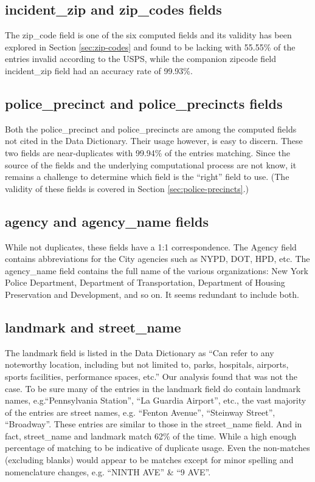 \documentclass[12pt, titlepage]{article}
\begin{document}
 \subsection{incident\_zip and zip\_codes fields}
 \label{sec:zipcodes}
 The zip\_code field is one of the six computed fields and its validity 
 has been explored in Section \ref{sec:zip-codes} and found to be 
 lacking with 55.55\% of the entries invalid according to the 
 USPS, while the companion zipcode field incident\_zip field had 
 an accuracy rate of 99.93\%. 

 \subsection{police\_precinct and police\_precincts fields} 
 \label{sec:police} 
Both the police\_precinct and police\_precincts are among the computed 
fields not cited in the Data Dictionary. Their usage however, is easy to 
discern. These two fields are near-duplicates with 99.94\% of the entries 
matching. Since the source of the fields and the underlying computational 
process are not know, it remains a challenge to determine which 
field is the ``right'' field to use. (The validity of these fields is 
covered in Section \ref{sec:police-precincts}.)

 \subsection{agency and agency\_name fields}
 \label{sec:agencyname}
 While not duplicates, these fields have a 1:1 correspondence.  The Agency 
 field contains abbreviations for the City agencies such as NYPD, DOT, 
 HPD, etc. The agency\_name field contains the full name of 
 the various organizations: New York Police Department, Department 
 of Transportation, Department of Housing Preservation and 
 Development, and so on. It seems redundant to include both.

\subsection{landmark and street\_name}
\label{sec:landmark}
The landmark field is listed in the Data Dictionary as ``Can refer to 
any noteworthy location, including but not limited to, parks, 
hospitals, airports, sports facilities, performance spaces, etc.'' Our analysis
found that was not the case. To be sure many of the entries in 
the landmark field do contain landmark names, e.g.``Pennsylvania 
Station'', ``La Guardia Airport'', etc., the vast majority 
of the entries are street names, e.g. ``Fenton Avenue'', ``Steinway 
Street'', ``Broadway''. These entries are similar to those in the 
street\_name field. And in fact, street\_name and landmark 
match 62\% of the time. While a high enough percentage of matching 
to be indicative of duplicate usage. Even the non-matches 
(excluding blanks) would appear to be matches except for minor 
spelling and nomenclature changes, e.g. ``NINTH AVE'' \& ``9 AVE''.
\end{document}
